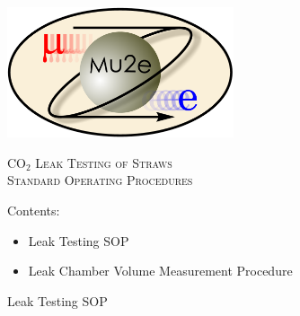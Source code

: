 \documentclass[letterpaper,12pt]{article}
\begin{document}
\begin{titlepage}
	\centering
	\includegraphics[width=0.5\textwidth]{mu2e_logo_oval}\par\vspace{2cm}
	{\scshape\LARGE CO$_2$ Leak Testing of Straws \\
		Standard Operating Procedures\par}
	\vspace{3cm}

	{\large Contents:
	\begin{itemize}
	\item Leak Testing SOP
	\item Leak Chamber Volume Measurement Procedure
	\end{itemize}
	}
	
	
\end{titlepage}

\newpage
\medskip
{\Large Leak Testing SOP}
\end{document}
